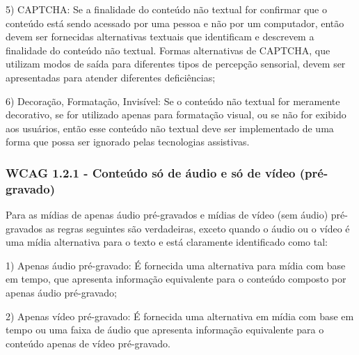 \documentclass[a4paper]{article}
\begin{document}
\begin{titlepage}
\hspace{.1\textwidth} %
\begin{minipage}{.85\textwidth}
	5) CAPTCHA: Se a finalidade do conteúdo não textual for confirmar que o conteúdo está sendo acessado por uma pessoa e não por um computador, então devem ser fornecidas alternativas textuais que identificam e descrevem a finalidade do conteúdo não textual. Formas alternativas de CAPTCHA, que utilizam modos de saída para diferentes tipos de percepção sensorial, devem ser apresentadas para atender diferentes deficiências;\\
\end{minipage}

\hspace{.1\textwidth} %
\begin{minipage}{.85\textwidth}
	6) Decoração, Formatação, Invisível: Se o conteúdo não textual for meramente decorativo, se for utilizado apenas para formatação visual, ou se não for exibido aos usuários, então esse conteúdo não textual deve ser implementado de uma forma que possa ser ignorado pelas tecnologias assistivas.\\
\end{minipage}

\subsubsection{WCAG 1.2.1 - Conteúdo só de áudio e só de vídeo (pré-gravado)}

Para as mídias de apenas áudio pré-gravados e mídias de vídeo (sem áudio) pré-gravados as regras seguintes são verdadeiras, exceto quando o áudio ou o vídeo é uma mídia alternativa para o texto e está claramente identificado como tal:\\

\hspace{.1\textwidth} %
\begin{minipage}{.85\textwidth}
	1) Apenas áudio pré-gravado: É fornecida uma alternativa para mídia com base em tempo, que apresenta informação equivalente para o conteúdo composto por apenas áudio pré-gravado;\\
\end{minipage}

\hspace{.1\textwidth} %
\begin{minipage}{.85\textwidth}
	2) Apenas vídeo pré-gravado: É fornecida uma alternativa em mídia com base em tempo ou uma faixa de áudio que apresenta informação equivalente para o conteúdo apenas de vídeo pré-gravado.
\end{minipage}

\end{titlepage}
\end{document}
